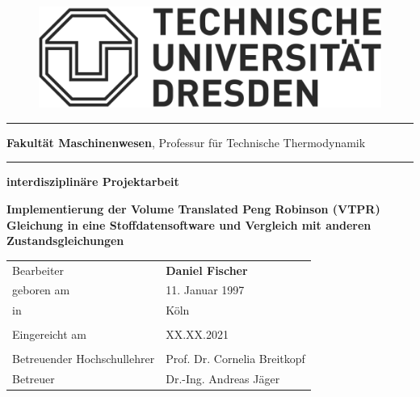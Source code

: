 \documentclass[../thesis.tex]{subfiles}
\begin{document}
\begin{titlepage}
	\begin{addmargin}[22mm]{0mm}
		\begin{figure}[t]
			\hspace*{5mm}\includegraphics[scale=0.35]{figs/Logo.png} \vspace{-8mm}
		\end{figure}
		\rule{140mm}{.4pt}
		\vspace{0.4mm}

		\scriptsize { {\bfseries Fakultät Maschinenwesen},
			Professur für Technische Thermodynamik}
		\vspace{-1.4mm}

		\rule{140mm}{.4pt}
		\vspace{2cm}

		{\Large \bfseries interdisziplinäre Projektarbeit}
		\vspace{2cm}

		{\LARGE \bfseries Implementierung der Volume Translated Peng Robinson (VTPR) Gleichung in eine Stoffdatensoftware und Vergleich mit anderen Zustandsgleichungen \par}
		\vspace{2cm}
		\begin{addmargin}[-2mm]{0mm}
			\large
			\begin{tabular}{l l}
			  Bearbeiter                   & {\bfseries Daniel Fischer} \\
			  geboren am                   & 11. Januar 1997 \\
			  in                           & Köln \\ \\
			  Eingereicht am               & XX.XX.2021 \\ \\
			  Betreuender Hochschullehrer  & Prof. Dr. Cornelia Breitkopf \\
			  Betreuer                     & Dr.-Ing. Andreas Jäger \\
			\end{tabular}
		\end{addmargin}
	\end{addmargin}
\end{titlepage}
\end{document}
